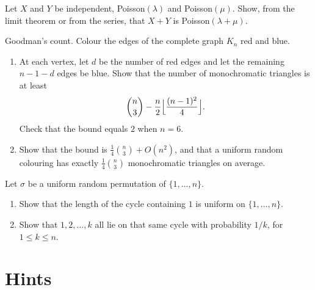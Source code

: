 \begin{exercise}[$\star$]\label{ex:twopoisson}
Let $X$ and $Y$ be independent, Poisson$(\lambda)$ and Poisson$(\mu)$. Show, from the limit theorem or from the series, that $X+Y$ is Poisson$(\lambda+\mu)$.
\end{exercise}


\begin{exercise}[$\star\star$]\label{pb:goodman}
Goodman's count. Colour the edges of the complete graph $K_n$ red and blue.
\begin{enumerate}[label=(\alph*)]
\item At each vertex, let $d$ be the number of red edges and let the remaining $n-1-d$ edges be blue. Show that the number of monochromatic triangles is at least
\[
 \binom n3-\frac n2\Bigl\lfloor\frac{(n-1)^2}4\Bigr\rfloor.
\]
Check that the bound equals $2$ when $n=6$.
\item Show that the bound is $\frac14\binom n3+O(n^2)$, and that a uniform random colouring has exactly $\frac14\binom n3$ monochromatic triangles on average.
\end{enumerate}
\end{exercise}

\begin{exercise}[$\star$]\label{pb:samecycle}
Let $\sigma$ be a uniform random permutation of $\{1,\ldots,n\}$.
\begin{enumerate}[label=(\alph*)]
\item Show that the length of the cycle containing $1$ is uniform on $\{1,\ldots,n\}$.
\item Show that $1,2,\ldots,k$ all lie on that same cycle with probability $1/k$, for $1\le k\le n$.
\end{enumerate}
\end{exercise}

\section{Hints}

